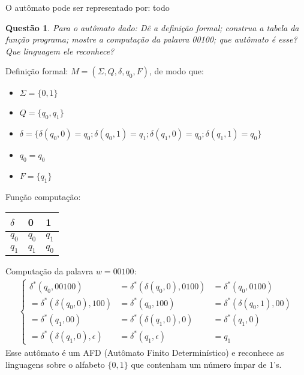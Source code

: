 \documentclass{article}
\newtheorem{problem}{Questão}
\begin{document}
    \begin{solution} O autômato pode ser representado por:
        todo
    \end{solution}
    
    \begin{problem}
        Para o autômato dado: Dê a definição formal; construa a tabela da função programa; mostre a computação da palavra 00100; que autômato é esse? Que linguagem ele reconhece?
        
        
    \end{problem}
    \begin{solution} Definição formal: $M = (\Sigma, Q, \delta, q_0, F)$, de modo que:
    \begin{itemize}
        \item $\Sigma = \{0,1\}$
        \item $Q = \{q_0, q_1\}$
        \item $\delta = \{\delta (q_0, 0) = q_0; \delta (q_0, 1) = q_1; \delta (q_1, 0) = q_0; \delta (q_1, 1) = q_0\}$
        \item $q_0 = q_0$
        \item $F = \{q_1\}$
    \end{itemize}
    Função computação:
    \begin{table}[H]
\centering
\begin{tabular}{|l|l|l|} 
\hline
$\delta$ & 0     & 1      \\ 
\hline
$q_0$    & $q_0$ & $q_1$  \\ 
\hline
$q_1$    & $q_1$ & $q_0$  \\
\hline
\end{tabular}
\end{table}

\noindent Computação da palavra $w = 00100$:
\begin{align*}
    \left\{\begin{matrix}
\delta^{*}(q_0,00100) & = \delta^{*}(\delta(q_0, 0),0100) & = \delta^{*}(q_0,0100) \\ 
= \delta^{*}(\delta(q_0, 0),100) & = \delta^{*}(q_0,100) & = \delta^{*}(\delta(q_0, 1),00)\\ 
= \delta^{*}(q_1,00) & = \delta^{*}(\delta(q_1, 0),0) & = \delta^{*}(q_1,0)\\ 
= \delta^{*}(\delta(q_1, 0),\epsilon) & = \delta^{*}(q_1,\epsilon) & = q_1
\end{matrix}\right.
\end{align*}
    Esse autômato é um AFD (Autômato Finito Determinístico) e reconhece as linguagens sobre o alfabeto $\{0,1\}$ que contenham um número ímpar de 1's.
    \end{solution}
    
\end{document}
